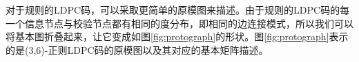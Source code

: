 对于规则的LDPC码，可以采取更简单的原模图来描述。由于规则的LDPC码的每一个信息节点与校验节点都有相同的度分布，即相同的边连接模式，所以我们可以将基本图折叠起来，让它变成如图\ref{fig:protograph}的形状。图\ref{fig:protograph}表示的是(3,6)-正则LDPC码的原模图以及其对应的基本矩阵描述。
\begin{center}
\def\linkdoub{\draw [double distance=1mm, very thick] (0,0)--}
\def\linksing{\draw [very thick] (0,0)--}
\def\check{%
    \filldraw [fill=white,very thick] (0,0) circle (5pt);
    \draw [very thick] (0,3.5pt)--(0,-3.5pt);
    \draw [very thick] (3.5pt,0)--(-3.5pt,0);
}
\def\bit{%
    \filldraw [fill=white,very thick] (0,0) circle (5pt);
    \draw [very thick] (-3.2pt,2.2pt)--(3.2pt,2.2pt);
    \draw [very thick] (-3.2pt,-2.2pt)--(3.2pt,-2.2pt);
}
\def\thetaone{90}
\def\thetatwo{-90}
\def\armLength{0.9}
\def\symbolDist{1}
\label{fig:protograph}
\end{center}

